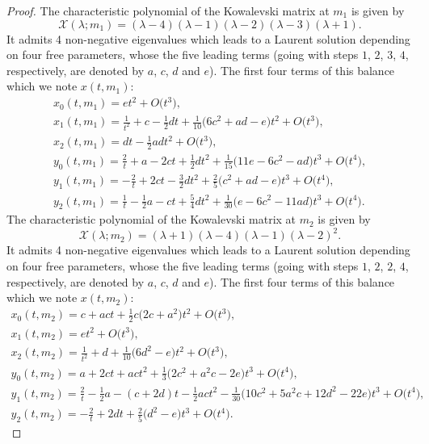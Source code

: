 \documentclass[pdftex]{sigma}
\numberwithin{equation}{section}
\begin{document}
\begin{proof}
The characteristic polynomial of the Kowalevski matrix at $m_1$
 is given by
 \[\mathcal{X}( \lambda;m_1)= ( \lambda-4 ) ( \lambda-1 ) (
 \lambda-2 )( \lambda-3 )( \lambda+1 ).
\]
It admits 4 non-negative eigenvalues which leads
to a Laurent solution depending on four free parameters, whose the
five leading terms (going with steps $1$, $2$, $3$, $4$, respectively, are
denoted by $a$, $c$, $d$ and $e$). The first four terms of this balance
which we note $x(t,m_1)$:
\begin{gather}
 x_0(t,m_1) = et^2 +O\bigl(t^3\bigr), \nonumber\\
 x_1(t,m_1) = \frac{1}{t^2}+c-\frac{1}{2}d t+\frac{1}{10}\bigl( 6c^2+ad-e\bigr)t^2+O\bigl(t^3\bigr), \nonumber\\
 x_2(t,m_1) = dt-\frac{1}{2}a d t^2+O\bigl(t^3\bigr), \nonumber\\
 y_0(t,m_1) = \frac{2}{t}+a-2ct+\frac{1}{2}d t^2+\frac{1}{15} \bigl(11e-6c^2-ad\bigr)t^3+O\bigl(t^4\bigr), \nonumber\\
 y_1(t,m_1) = -\frac{2}{t}+2ct-\frac{3}{2}d t^2+\frac{2}{5} \bigl(c^2+ad-e\bigr)t^3+O\bigl(t^4\bigr), \nonumber\\
 y_2(t,m_1) = \frac{1}{t}-\frac{1}{2}a-c t+\frac{5}{4}dt^2+\frac{ 1}{30}\bigl(e-6c^2-11ad\bigr)t^3+O\bigl(t^4\bigr). \label{balancemainem1}
\end{gather}
The characteristic polynomial of the Kowalevski matrix at $m_2$
 is given by
 \[\mathcal{X}( \lambda;m_2)= ( \lambda+1 ) ( \lambda-4 ) ( \lambda-1) ( \lambda-2 ) ^{2}.
\]It admits 4 non-negative eigenvalues which leads
to a Laurent solution depending on four free parameters, whose the
five leading terms (going with steps $1$, $2$, $2$, $4$, respectively, are
denoted by $a$, $c$, $d$ and $e$). The first four terms of this balance
which we note $x(t,m_2)$:
\begin{gather}
 x_0(t,m_2) = c+act+\frac{1}{2}c\bigl(2c+a^2\bigr)t^2+O\bigl(t^3 \bigr), \nonumber\\
 x_1(t,m_2) = et^2+O\bigl(t^3\bigr), \nonumber\\
 x_2(t,m_2) = \frac{1}{t^2}+d+\frac{1}{10}\bigl(6d^2-e\bigr)t^2 +O\bigl(t^3\bigr), \nonumber\\
 y_0(t,m_2) = a+2ct+act^2+\frac{1}{3}\bigl(2c^2+a^2c-2e\bigr)t^3 +O\bigl(t^4\bigr), \nonumber\\
 y_1(t,m_2) = \frac{2}{t}-\frac{1}{2}a-(c+2d)t-\frac{1 }{2}act^2-\frac{1}{30}\bigl(10c^2+5a^2c+12d^2-22e\bigr)t^3+O\bigl(t^4\bigr), \label{balancemainem2}\\
 y_2(t,m_2) = -\frac{2}{t}+2dt+\frac{2}{5}\bigl(d^2-e\bigr)t^3+ O\bigl(t^4\bigr).
\tag*{\qed}
\end{gather}
\renewcommand{\qed}{}
\end{proof}
\end{document}
